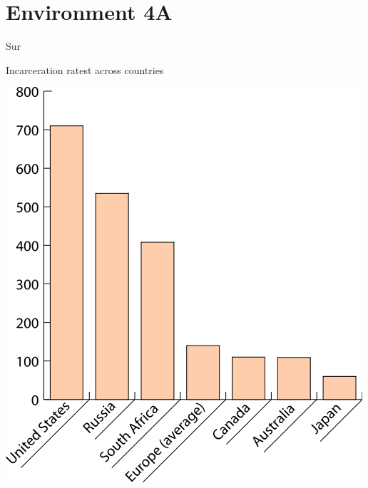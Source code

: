 \section{Environment 4A}

\begin{map}{S}{ur}
\caption{Incarceration ratest across countries}
\label{chart:incarceration}
\includegraphics[width=\chartwidth,height=\chartheight]{incarceration}  
\end{map}

